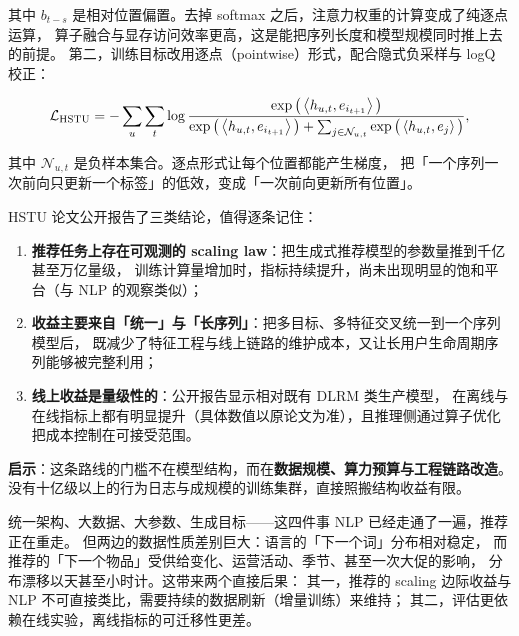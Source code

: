 其中 $b_{t-s}$ 是相对位置偏置。去掉 softmax 之后，注意力权重的计算变成了纯逐点运算，
算子融合与显存访问效率更高，这是能把序列长度和模型规模同时推上去的前提。
第二，训练目标改用逐点（pointwise）形式，配合隐式负采样与 logQ 校正：

\begin{equation}
\mathcal{L}_{\text{HSTU}}
= - \sum_{u} \sum_{t}
\log \frac{ \exp\big( \left\langle  h_{u,t} ,  e_{i_{t+1}}  \right\rangle \big) }
          { \exp\big( \left\langle  h_{u,t} ,  e_{i_{t+1}}  \right\rangle \big)
            + \sum_{j \in \mathcal{N}_{u,t}} \exp\big( \left\langle  h_{u,t} ,  e_{j}  \right\rangle \big) } ,
\label{eq:hstu}
\end{equation}

其中 $\mathcal{N}_{u,t}$ 是负样本集合。逐点形式让每个位置都能产生梯度，
把「一个序列一次前向只更新一个标签」的低效，变成「一次前向更新所有位置」。

\begin{casebox}
HSTU 论文公开报告了三类结论，值得逐条记住：
\begin{enumerate}
  \item \textbf{推荐任务上存在可观测的 scaling law}：把生成式推荐模型的参数量推到千亿甚至万亿量级，
        训练计算量增加时，指标持续提升，尚未出现明显的饱和平台（与 NLP 的观察类似）；
  \item \textbf{收益主要来自「统一」与「长序列」}：把多目标、多特征交叉统一到一个序列模型后，
        既减少了特征工程与线上链路的维护成本，又让长用户生命周期序列能够被完整利用；
  \item \textbf{线上收益是量级性的}：公开报告显示相对既有 DLRM 类生产模型，
        在离线与在线指标上都有明显提升（具体数值以原论文为准），且推理侧通过算子优化把成本控制在可接受范围。
\end{enumerate}
\textbf{启示}：这条路线的门槛不在模型结构，而在\textbf{数据规模、算力预算与工程链路改造}。
没有十亿级以上的行为日志与成规模的训练集群，直接照搬结构收益有限。
\end{casebox}

\begin{insight}
统一架构、大数据、大参数、生成目标——这四件事 NLP 已经走通了一遍，推荐正在重走。
但两边的数据性质差别巨大：语言的「下一个词」分布相对稳定，
而推荐的「下一个物品」受供给变化、运营活动、季节、甚至一次大促的影响，
分布漂移以天甚至小时计。这带来两个直接后果：
其一，推荐的 scaling 边际收益与 NLP 不可直接类比，需要持续的数据刷新（增量训练）来维持；
其二，评估更依赖在线实验，离线指标的可迁移性更差。
\end{insight}

